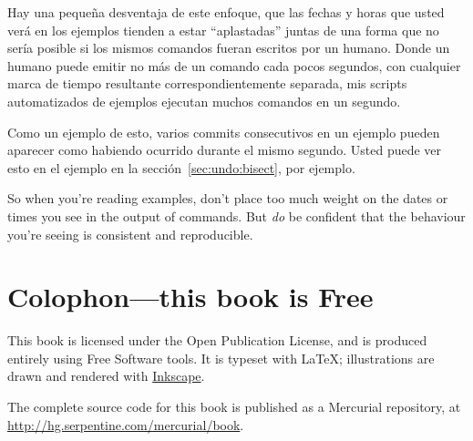 Hay una pequeña desventaja de este enfoque, que las fechas y horas que
usted verá en los ejemplos tienden a estar ``aplastadas'' juntas de una
forma que no sería posible si los mismos comandos fueran escritos por
un humano. Donde un humano puede emitir no más de un comando cada
pocos segundos, con cualquier marca de tiempo resultante
correspondientemente separada, mis scripts automatizados de ejemplos
ejecutan muchos comandos en un segundo.

Como un ejemplo de esto, varios commits consecutivos en un ejemplo
pueden aparecer como habiendo ocurrido durante el mismo segundo. Usted
puede ver esto en el ejemplo  en la
sección~\ref{sec:undo:bisect}, por ejemplo.

So when you're reading examples, don't place too much weight on the
dates or times you see in the output of commands.  But \emph{do} be
confident that the behaviour you're seeing is consistent and
reproducible.

\section{Colophon---this book is Free}

This book is licensed under the Open Publication License, and is
produced entirely using Free Software tools.  It is typeset with
\LaTeX{}; illustrations are drawn and rendered with
\href{http://www.inkscape.org/}{Inkscape}.

The complete source code for this book is published as a Mercurial
repository, at \url{http://hg.serpentine.com/mercurial/book}.

